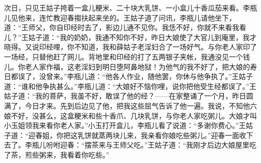次日，只见王姑子挎着一盒儿粳米、二十块大乳饼、一小盒儿十香瓜茄来看。李瓶儿见他来，连忙教迎春搊扶起来坐的。王姑子道了问讯，李瓶儿请他坐下，道：“王师父，你自印经时去了，影边儿通不见你。我恁不好，你就不来看我看儿？”王姑子道：“我的奶奶，我通不知你不好，昨日大娘使了大官儿到庵里，我才晓得。又说印经哩，你不知道，我和薛姑子老淫妇合了一场好气。与你老人家印了一场经，只替他赶了网儿。背地里和印经的打了五两银子夹帐，我通没见一个钱儿。你老人家作福，这老淫妇到明日堕阿鼻地狱！为他气的我不好了，把大娘的寿日都误了，没曾来。”李瓶儿道：“他各人作业，随他罢，你休与他争执了。”王姑子道：“谁和他争执甚么。”李瓶儿道：“大娘好不恼你哩，说你把他受生经都误了。”王姑子道：“我的菩萨，我虽不好，敢误了他的经？——在家整诵了一个月，昨日圆满了，今日才来。先到后边见了他，把我这些屈气告诉了他一遍。我说，不知他六娘不好，没甚么，这盒粳米和些十香爪、几块乳饼，与你老人家吃粥儿。大娘才叫小玉姐领我来看你老人家。”小玉打开盒儿，李瓶儿看了说道：“多谢你费心。”王姑子道：“迎春姐，你把这乳饼就蒸两块儿来，我亲看你娘吃些粥儿。”迎春一面收下去了。李瓶儿吩咐迎春：“摆茶来与王师父吃。”王姑子道：“我刚才后边大娘屋里吃了茶，煎些粥来，我看着你吃些。”

